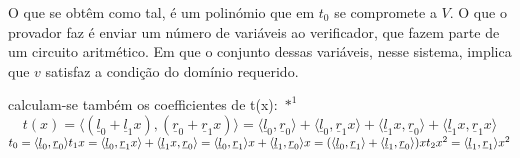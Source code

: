 O que se obtêm como tal, é um polinómio que em $t_0$ se compromete a $V$. O que o provador faz é enviar um número de variáveis ao verificador, que fazem parte de um circuito aritmético. Em que o conjunto dessas variáveis, nesse sistema, implica que $v$ satisfaz a condição do domínio requerido.\newline

calculam-se também os coefficientes de t(x): $*^1$
\[t(x) = \langle (\underline{l}_0 + \underline{l}_1 x), (\underline{r}_0 + \underline{r}_1 x) \rangle = \langle \underline{l}_0, \underline{r}_0 \rangle + \langle \underline{l}_0, \underline{r}_1 x \rangle + \langle \underline{l}_1 x, \underline{r}_0 \rangle + \langle \underline{l}_1 x, \underline{r}_1 x \rangle\]
\newline
$t_0 = \langle \underline{l}_0, \underline{r}_0 \rangle\\
t_1 x = \langle \underline{l}_0, \underline{r}_1 x \rangle + \langle \underline{l}_1 x, \underline{r}_0 \rangle = \langle \underline{l}_0, \underline{r}_1 \rangle x + \langle \underline{l}_1, \underline{r}_0 \rangle x = (\langle \underline{l}_0, \underline{r}_1 \rangle + \langle \underline{l}_1, \underline{r}_0 \rangle ) x\\
t_2 x^2 = \langle \underline{l}_1, \underline{r}_1 \rangle x^2$

